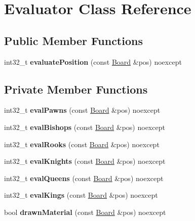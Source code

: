 \hypertarget{classEvaluator}{}\section{Evaluator Class Reference}
\label{classEvaluator}
\subsection*{Public Member Functions}
\begin{DoxyCompactItemize}
\item 
\mbox{\label{classEvaluator_a82ac01bb85da704f7a9f1a059c0e91fb}} 
int32\+\_\+t {\bfseries evaluate\+Position} (const \mbox{\hyperlink{classBoard}{Board}} \&pos) noexcept
\end{DoxyCompactItemize}
\subsection*{Private Member Functions}
\begin{DoxyCompactItemize}
\item 
\mbox{\label{classEvaluator_a76e81d148449a9bb6c1616895223ad77}} 
int32\+\_\+t {\bfseries eval\+Pawns} (const \mbox{\hyperlink{classBoard}{Board}} \&pos) noexcept
\item 
\mbox{\label{classEvaluator_ab8235a37e631665e0dbdbffdddf015f7}} 
int32\+\_\+t {\bfseries eval\+Bishops} (const \mbox{\hyperlink{classBoard}{Board}} \&pos) noexcept
\item 
\mbox{\label{classEvaluator_ac1cfc6e10fcd71fc4148415d889a4085}} 
int32\+\_\+t {\bfseries eval\+Rooks} (const \mbox{\hyperlink{classBoard}{Board}} \&pos) noexcept
\item 
\mbox{\label{classEvaluator_aaf81df6872cb3c5acabc05b4865c4bcd}} 
int32\+\_\+t {\bfseries eval\+Knights} (const \mbox{\hyperlink{classBoard}{Board}} \&pos) noexcept
\item 
\mbox{\label{classEvaluator_a322d577548dd00c32e949cad62a17393}} 
int32\+\_\+t {\bfseries eval\+Queens} (const \mbox{\hyperlink{classBoard}{Board}} \&pos) noexcept
\item 
\mbox{\label{classEvaluator_af8971fc82010e0a08a1e510847bf304c}} 
int32\+\_\+t {\bfseries eval\+Kings} (const \mbox{\hyperlink{classBoard}{Board}} \&pos) noexcept
\item 
\mbox{\label{classEvaluator_aec21b1e28f162b7f1e4edc9e8f725a8b}} 
bool {\bfseries drawn\+Material} (const \mbox{\hyperlink{classBoard}{Board}} \&pos) noexcept
\end{DoxyCompactItemize}


